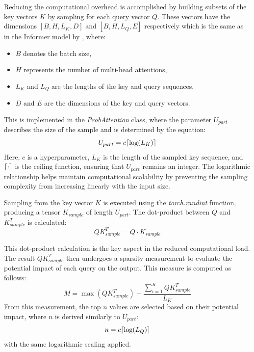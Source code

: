 \documentclass{article}
\DeclarePairedDelimiter{\ceil}{\lceil}{\rceil}
\begin{document}
Reducing the computational overhead is accomplished by building subsets of the key vectors $K$ by sampling for each query vector $Q$. These vectors have the dimensions $[B, H, L_K, D]$ and $[B, H, L_Q, E]$ respectively which is the same as in the Informer model by \cite{Informer}, where:
\begin{itemize}
    \item $B$ denotes the batch size,
    \item $H$ represents the number of multi-head attentions,
    \item $L_K$ and $L_Q$ are the lengths of the key and query sequences,
    \item $D$ and $E$ are the dimensions of the key and query vectors.
\end{itemize}

This is implemented in the \textit{ProbAttention} class, where the parameter $U_{part}$ describes the size of the sample and is determined by the equation:
\begin{equation}
    U_{part} = c \ceil*{\log(L_K)}
\end{equation}
Here, $c$ is a hyperparameter, $L_K$ is the length of the sampled key sequence, and $\ceil*{\cdot}$ is the ceiling function, ensuring that $U_{part}$ remains an integer. The logarithmic relationship helps maintain computational scalability by preventing the sampling complexity from increasing linearly with the input size.

Sampling from the key vector $K$ is executed using the \textit{torch.randint} function, producing a tensor $K_{sample}$ of length $U_{part}$. The dot-product between $Q$ and $K_{sample}^T$ is calculated:
\begin{equation}
    QK^T_{sample} = Q \cdot K_{sample}
\end{equation}

This dot-product calculation is the key aspect in the reduced computational load. The result $QK^T_{sample}$ then undergoes a sparsity measurement to evaluate the potential impact of each query on the output. This measure is computed as follows:
\begin{equation}
    M = \max(QK^T_{sample}) - \frac{\sum^K_{i=1} QK^T_{sample}}{L_K}
\end{equation}
From this measurement, the top $n$ values are selected based on their potential impact, where $n$ is derived similarly to $U_{part}$:
\begin{equation}
    n = c \ceil*{\log(L_Q)}
\end{equation}
with the same logarithmic scaling applied.
\end{document}
